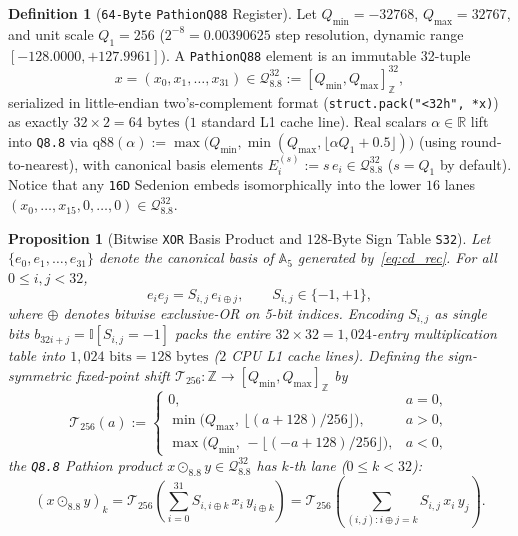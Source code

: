 \documentclass[11pt]{article}
\theoremstyle{plain}
\newtheorem{proposition}[theorem]{Proposition}
\theoremstyle{definition}
\newtheorem{definition}[theorem]{Definition}
\begin{document}
\begin{definition}[\texttt{64-Byte} \texttt{PathionQ88} Register]\label{def:pathion_q88}
Let $Q_{\min} = -32768$, $Q_{\max} = 32767$, and unit scale $Q_1 = 256$ ($2^{-8} = 0.00390625$ step resolution, dynamic range $[-128.0000, +127.9961]$). A \texttt{PathionQ88} element is an immutable 32-tuple
\begin{equation}
  x = (x_0, x_1, \dots, x_{31}) \in \mathcal{Q}_{8.8}^{32} := [Q_{\min}, Q_{\max}]_{\mathbb{Z}}^{32},
\end{equation}
serialized in little-endian two's-complement format (\texttt{struct.pack("<32h", *x)}) as exactly $32 \times 2 = 64\text{ bytes}$ ($1$ standard L1 cache line). Real scalars $\alpha \in \mathbb{R}$ lift into \texttt{Q8.8} via $\mathrm{q88}(\alpha) := \max\!\bigl(Q_{\min}, \min(Q_{\max}, \lfloor \alpha Q_1 + 0.5 \rfloor)\bigr)$ (using round-to-nearest), with canonical basis elements $E_i^{(s)} := s\, e_i \in \mathcal{Q}_{8.8}^{32}$ ($s = Q_1$ by default). Notice that any \texttt{16D} Sedenion embeds isomorphically into the lower $16$ lanes $(x_0, \dots, x_{15}, 0, \dots, 0) \in \mathcal{Q}_{8.8}^{32}$.
\end{definition}

\begin{proposition}[Bitwise \texttt{XOR} Basis Product and $128$-Byte Sign Table \texttt{S32}]\label{prop:xor_lut}
Let $\{e_0, e_1, \dots, e_{31}\}$ denote the canonical basis of $\mathbb{A}_5$ generated by~\eqref{eq:cd_rec}. For all $0 \le i, j < 32$,
\begin{equation}\label{eq:xor_basis}
  e_i e_j = S_{i,j}\, e_{i \oplus j}, \qquad S_{i,j} \in \{-1, +1\},
\end{equation}
where $\oplus$ denotes bitwise exclusive-OR on 5-bit indices. Encoding $S_{i,j}$ as single bits $b_{32i + j} = \mathbb{I}[S_{i,j} = -1]$ packs the entire $32 \times 32 = 1{,}024$-entry multiplication table into $1{,}024\text{ bits} = 128\text{ bytes}$ ($2$ CPU L1 cache lines). Defining the sign-symmetric fixed-point shift $\mathcal{T}_{256} : \mathbb{Z} \to [Q_{\min}, Q_{\max}]_{\mathbb{Z}}$ by
\begin{equation}\label{eq:trunc_256}
  \mathcal{T}_{256}(a) := \begin{cases}
    0, & a = 0, \\
    \min\!\bigl(Q_{\max},\, \lfloor (a + 128) / 256 \rfloor\bigr), & a > 0, \\
    \max\!\bigl(Q_{\min},\, -\lfloor (-a + 128) / 256 \rfloor\bigr), & a < 0,
  \end{cases}
\end{equation}
the \texttt{Q8.8} Pathion product $x \odot_{8.8} y \in \mathcal{Q}_{8.8}^{32}$ has $k$-th lane ($0 \le k < 32$):
\begin{equation}\label{eq:cd_mult_q88}
  (x \odot_{8.8} y)_k = \mathcal{T}_{256}\!\left(\sum_{i=0}^{31} S_{i, i \oplus k}\, x_i\, y_{i \oplus k}\right) = \mathcal{T}_{256}\!\left(\sum_{(i,j) : i \oplus j = k} S_{i,j}\, x_i\, y_j\right).
\end{equation}
\end{proposition}
\end{document}
